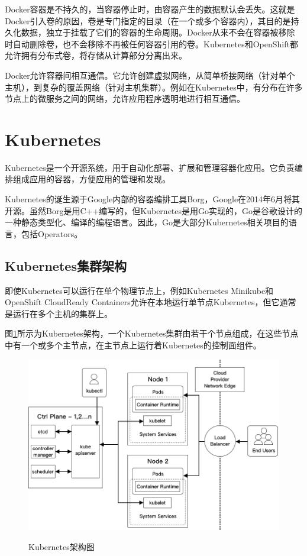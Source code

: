 \documentclass[macfonts,master]{njuthesis}
\begin{document}
Docker容器是不持久的，当容器停止时，由容器产生的数据默认会丢失。这就是Docker引入卷的原因，卷是专门指定的目录（在一个或多个容器内），其目的是持久化数据，独立于挂载了它们的容器的生命周期。Docker从来不会在容器被移除时自动删除卷，也不会移除不再被任何容器引用的卷。Kubernetes和OpenShift都允许拥有分布式卷，将存储从计算部分分离出来。

Docker允许容器间相互通信。它允许创建虚拟网络，从简单桥接网络（针对单个主机），到复杂的覆盖网络（针对主机集群）。例如在Kubernetes中，有分布在许多节点上的微服务之间的网络，允许应用程序透明地进行相互通信。

\section{Kubernetes}
Kubernetes是一个开源系统，用于自动化部署、扩展和管理容器化应用\cite{whatisk8s}。它负责编排组成应用的容器，方便应用的管理和发现。

Kubernetes的诞生源于Google内部的容器编排工具Borg，Google在2014年6月\cite{googleopen}将其开源\cite{k8sorigin}。虽然Borg是用C++编写的，但Kubernetes是用Go实现的，Go是谷歌设计的一种静态类型化、编译的编程语言。因此，Go是大部分Kubernetes相关项目的语言，包括Operators。

\subsection{Kubernetes集群架构}
即使Kubernetes可以运行在单个物理节点上，例如Kubernetes Minikube和OpenShift CloudReady Containers允许在本地运行单节点Kubernetes，但它通常是运行在多个主机的集群上。

图\ref{fig:k8s-arch}所示为Kubernetes架构，一个Kubernetes集群由若干个节点组成，在这些节点中有一个或多个主节点，在主节点上运行着Kubernetes的控制面组件。

\begin{figure}[htbp]
  \centering
  \includegraphics[width= 1\textwidth]{pics/Kubernetes-architecture.png}\\
  \caption{Kubernetes架构图}\label{fig:k8s-arch}
\end{figure}
\end{document}
